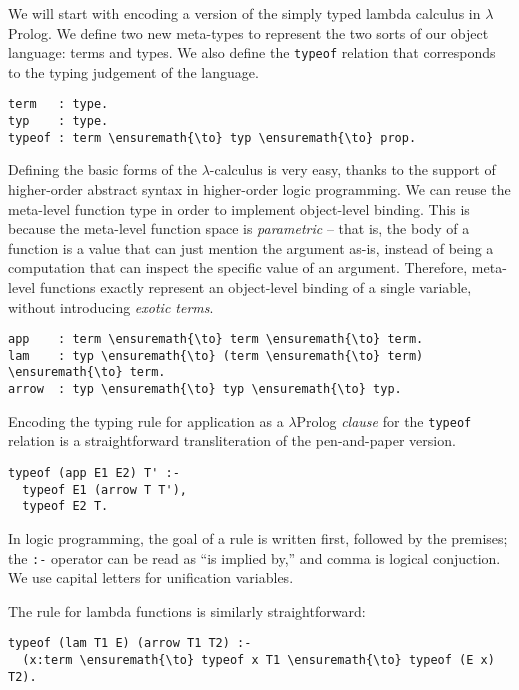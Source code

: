 We will start with encoding a version of the simply typed lambda
calculus in \ensuremath{\lambda}Prolog. We define two new meta-types to represent the two
sorts of our object language: terms and types. We also define the
\texttt{typeof} relation that corresponds to the typing judgement of the
language.

\begin{verbatim}
term   : type.
typ    : type.
typeof : term \ensuremath{\to} typ \ensuremath{\to} prop.
\end{verbatim}

Defining the basic forms of the \ensuremath{\lambda}-calculus is very easy, thanks to the
support of higher-order abstract syntax in higher-order logic
programming. We can reuse the meta-level function type in order to
implement object-level binding. This is because the meta-level function
space is \emph{parametric} -- that is, the body of a function is a value
that can just mention the argument as-is, instead of being a computation
that can inspect the specific value of an argument. Therefore,
meta-level functions exactly represent an object-level binding of a
single variable, without introducing \emph{exotic terms}.

\begin{verbatim}
app    : term \ensuremath{\to} term \ensuremath{\to} term.
lam    : typ \ensuremath{\to} (term \ensuremath{\to} term) \ensuremath{\to} term.
arrow  : typ \ensuremath{\to} typ \ensuremath{\to} typ.
\end{verbatim}

Encoding the typing rule for application as a \ensuremath{\lambda}Prolog \emph{clause} for
the \texttt{typeof} relation is a straightforward transliteration of the
pen-and-paper version.

\begin{verbatim}
typeof (app E1 E2) T' :-
  typeof E1 (arrow T T'),
  typeof E2 T.
\end{verbatim}

In logic programming, the goal of a rule is written first, followed by
the premises; the \texttt{:-} operator can be read as ``is implied by,''
and comma is logical conjuction. We use capital letters for unification
variables.

The rule for lambda functions is similarly straightforward:

\begin{verbatim}
typeof (lam T1 E) (arrow T1 T2) :-
  (x:term \ensuremath{\to} typeof x T1 \ensuremath{\to} typeof (E x) T2).
\end{verbatim}

